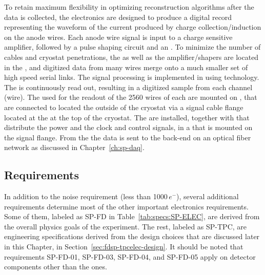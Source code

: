 To retain maximum flexibility in optimizing reconstruction algorithms after 
the  data is collected, the  electronics are designed 
to produce a digital record representing the waveform of the current produced 
by charge collection/induction on the anode wires.  Each anode wire signal is 
input to a charge sensitive amplifier, followed by a pulse shaping circuit and 
an .  To minimize the number of cables and cryostat penetrations, 
the  as well as the amplifier/shapers are located in the , 
and digitized data from many wires merge onto a much smaller set of high speed 
serial links. The  signal processing is implemented in 
using  technology.  The  is continuously 
read out, resulting in a digitized  sample from each  
channel (wire). The  used for the readout of the \num{2560}
wires of each  are mounted on , that are connected to
 located the outside of the cryostat via a  signal 
cable flange located at the  \fdth at the top of the cryostat.
The  are installed, together with  that distribute
the power and the clock and control signals, in a  that is
mounted on the signal flange. From the  the data is sent to 
the  back-end on an optical fiber network as discussed in 
Chapter~\ref{ch:sp-daq}.

\subsection{Requirements}
\label{sec:fdsp-tpcelec-overview-requirements}

In addition to the noise requirement (less than \num{1000}\,$e^{-}$), several 
additional requirements determine most of the other important  
electronics requirements. Some of them, labeled as SP-FD in Table~\ref{tab:specs:SP-ELEC},
are derived from the overall physics goals of the experiment. The rest, labeled
as SP-TPC, are engineering specifications derived from the design choices that
are discussed later in this Chapter, in Section~\ref{sec:fdsp-tpcelec-design}.
It should be noted that requirements SP-FD-01, SP-FD-03, SP-FD-04, and SP-FD-05
apply on detector components other than the  ones.



